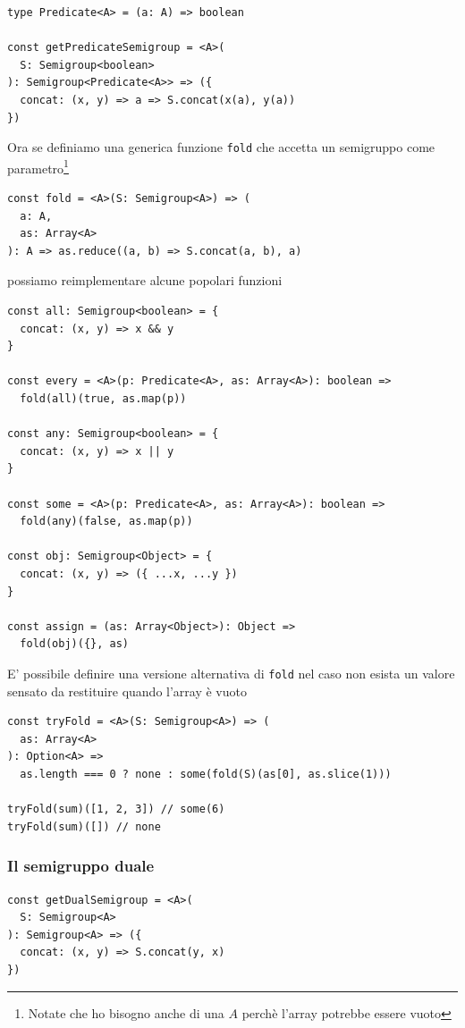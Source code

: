 \documentclass[12pt]{article}
\begin{document}
\begin{verbatim}
type Predicate<A> = (a: A) => boolean

const getPredicateSemigroup = <A>(
  S: Semigroup<boolean>
): Semigroup<Predicate<A>> => ({
  concat: (x, y) => a => S.concat(x(a), y(a))
})
\end{verbatim}

Ora se definiamo una generica funzione \texttt{fold} che accetta un semigruppo come parametro\footnote{Notate che ho bisogno anche di una $A$ perchè l'array potrebbe essere vuoto}

\begin{verbatim}
const fold = <A>(S: Semigroup<A>) => (
  a: A,
  as: Array<A>
): A => as.reduce((a, b) => S.concat(a, b), a)
\end{verbatim}

possiamo reimplementare alcune popolari funzioni

\begin{verbatim}
const all: Semigroup<boolean> = {
  concat: (x, y) => x && y
}

const every = <A>(p: Predicate<A>, as: Array<A>): boolean =>
  fold(all)(true, as.map(p))

const any: Semigroup<boolean> = {
  concat: (x, y) => x || y
}

const some = <A>(p: Predicate<A>, as: Array<A>): boolean =>
  fold(any)(false, as.map(p))

const obj: Semigroup<Object> = {
  concat: (x, y) => ({ ...x, ...y })
}

const assign = (as: Array<Object>): Object =>
  fold(obj)({}, as)
\end{verbatim}

E' possibile definire una versione alternativa di \texttt{fold} nel caso non esista un valore sensato da restituire quando l'array è vuoto

\begin{verbatim}
const tryFold = <A>(S: Semigroup<A>) => (
  as: Array<A>
): Option<A> =>
  as.length === 0 ? none : some(fold(S)(as[0], as.slice(1)))

tryFold(sum)([1, 2, 3]) // some(6)
tryFold(sum)([]) // none
\end{verbatim}

\subsubsection{Il semigruppo duale}

\begin{verbatim}
const getDualSemigroup = <A>(
  S: Semigroup<A>
): Semigroup<A> => ({
  concat: (x, y) => S.concat(y, x)
})
\end{verbatim}
\end{document}
